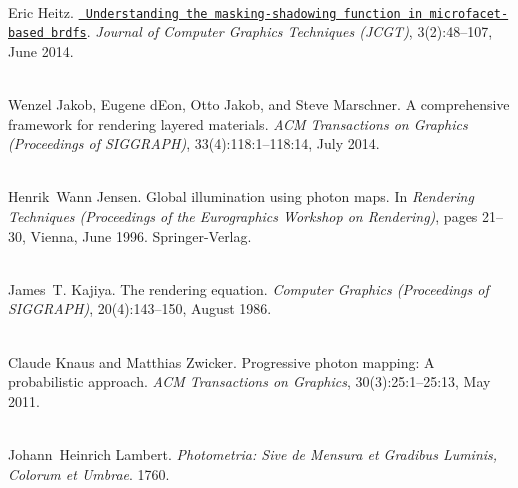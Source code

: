 \begin{DoxyDescription}
\item[\label{citelist_CITEREF_Heitz:2014:Microfacet}%
\Hypertarget{citelist_CITEREF_Heitz:2014:Microfacet}%
\mbox{[}7\mbox{]}]\hfill \\
Eric Heitz. \href{http://jcgt.org/published/0003/02/03/}{\texttt{ Understanding the masking-\/shadowing function in microfacet-\/based brdfs}}. {\itshape Journal of Computer Graphics Techniques (JCGT)}, 3(2)\+:48--107, June 2014.


\item[\label{citelist_CITEREF_Jakob:2014:Comprehensive}%
\Hypertarget{citelist_CITEREF_Jakob:2014:Comprehensive}%
\mbox{[}8\mbox{]}]\hfill \\
Wenzel Jakob, Eugene d\textquotesingle{}Eon, Otto Jakob, and Steve Marschner. A comprehensive framework for rendering layered materials. {\itshape ACM Transactions on Graphics (Proceedings of SIGGRAPH)}, 33(4)\+:118\+:1--118\+:14, July 2014. 


\item[\label{citelist_CITEREF_Jensen:1996:Global}%
\Hypertarget{citelist_CITEREF_Jensen:1996:Global}%
\mbox{[}9\mbox{]}]\hfill \\
Henrik~Wann Jensen. Global illumination using photon maps. In {\itshape Rendering Techniques (Proceedings of the Eurographics Workshop on Rendering)}, pages 21--30, Vienna, June 1996. Springer-\/\+Verlag. 


\item[\label{citelist_CITEREF_Kajiya:1986:Rendering}%
\Hypertarget{citelist_CITEREF_Kajiya:1986:Rendering}%
\mbox{[}10\mbox{]}]\hfill \\
James~T. Kajiya. The rendering equation. {\itshape Computer Graphics (Proceedings of SIGGRAPH)}, 20(4)\+:143--150, August 1986. 


\item[\label{citelist_CITEREF_Knaus:2011:Progressive}%
\Hypertarget{citelist_CITEREF_Knaus:2011:Progressive}%
\mbox{[}11\mbox{]}]\hfill \\
Claude Knaus and Matthias Zwicker. Progressive photon mapping\+: A probabilistic approach. {\itshape ACM Transactions on Graphics}, 30(3)\+:25\+:1--25\+:13, May 2011. 


\item[\label{citelist_CITEREF_Lambert:1760:Photometria}%
\Hypertarget{citelist_CITEREF_Lambert:1760:Photometria}%
\mbox{[}12\mbox{]}]\hfill \\
Johann~Heinrich Lambert. {\itshape Photometria\+: Sive de Mensura et Gradibus Luminis, Colorum et Umbrae}. 1760.



\end{DoxyDescription}
